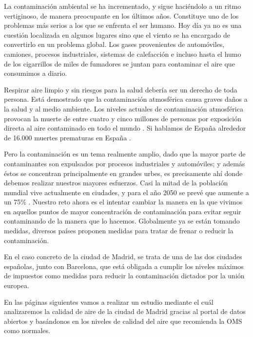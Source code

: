 
La contaminación ambiental se ha incrementado, y sigue haciéndolo a un ritmo vertiginoso, de manera preocupante en los últimos años. Constituye uno de los problemas más serios a los que se enfrenta el ser humano. Hoy día ya no es una cuestión localizada en algunos lugares sino que el viento se ha encargado de convertirlo en un problema global. Los gases provenientes de automóviles, camiones, procesos industriales, sistemas de calefacción e incluso hasta el humo de los cigarrillos de miles de fumadores se juntan para contaminar el aire que consumimos a diario. 

Respirar aire limpio y sin riesgos para la salud debería ser un derecho de toda persona. Está demostrado que la contaminación atmosférica causa graves daños a la salud y al medio ambiente. Los niveles actuales de contaminación atmosférica provocan la muerte de entre cuatro y cinco millones de personas por exposición directa al aire contaminado en todo el mundo \cite{sharma_anirudh_anirudh_2018}. Si hablamos de España alrededor de 16.000 muertes prematuras en España \cite{informe_EeA_2019}.

Pero la contaminación es un tema realmente amplio, dado que la mayor parte de contaminantes son expulsados por procesos industriales y automóviles; y además éstos se concentran principalmente en grandes urbes, es precisamente ahí donde debemos realizar nuestros mayores esfuerzos. Casi la mitad de la población mundial vive actualmente en ciudades, y para el año 2050 se prevé que aumente a un 75\% \cite{bbc_ciudades}. Nuestro reto ahora es el intentar cambiar la manera en la que vivimos en aquellos puntos de mayor concentración de contaminación para evitar seguir contaminando de la manera que lo hacemos. Globalmente ya se están tomando medidas, diversos países proponen medidas para tratar de frenar o reducir la contaminación. 

En el caso concreto de la ciudad de Madrid, se trata de una de las dos ciudades españolas, junto con Barcelona, que está obligada a cumplir los niveles máximos de  impuestos como medidas para reducir la contaminación dictados por la unión europea. 

En las páginas siguientes vamos a realizar un estudio mediante el cuál analizaremos la calidad de aire de la ciudad de Madrid gracias al portal de datos abiertos y basándonos en los niveles de calidad del aire que recomienda la OMS como normales.